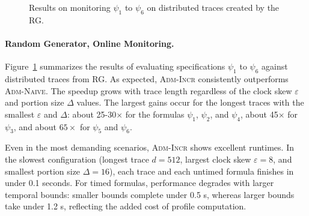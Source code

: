 
\begin{figure}[t]
	\begin{center}
		\caption{Results on monitoring $\psi_1$ to $\psi_6$ on distributed traces created by the RG.}	\label{fig:rgresultsOnline}
	\end{center}
\end{figure}


\paragraph*{Random Generator, Online Monitoring.}
Figure~\ref{fig:rgresultsOnline} summarizes the results of evaluating specifications $\psi_1$ to $\psi_6$ against distributed traces from RG.
As expected, \textsc{Adm-Incr} consistently outperforms \textsc{Adm-Naive}.
The speedup grows with trace length regardless of the clock skew $\varepsilon$ and portion size $\Delta$ values.
The largest gains occur for the longest traces with the smallest $\varepsilon$ and $\Delta$: about 25-30$\times$ for the formulas $\psi_1$, $\psi_2$, and $\psi_4$, about 45$\times$ for $\psi_3$, and about $65\times$ for $\psi_5$ and $\psi_6$.

Even in the most demanding scenarios, \textsc{Adm-Incr} shows excellent runtimes.
In the slowest configuration (longest trace $d=512$, largest clock skew $\varepsilon=8$, and smallest portion size $\Delta=16$), each trace and each untimed formula finishes in under 0.1 seconds.
For timed formulas, performance degrades with larger temporal bounds: smaller bounds complete under 0.5 s, whereas larger bounds take under 1.2 s, reflecting the added cost of profile computation.

